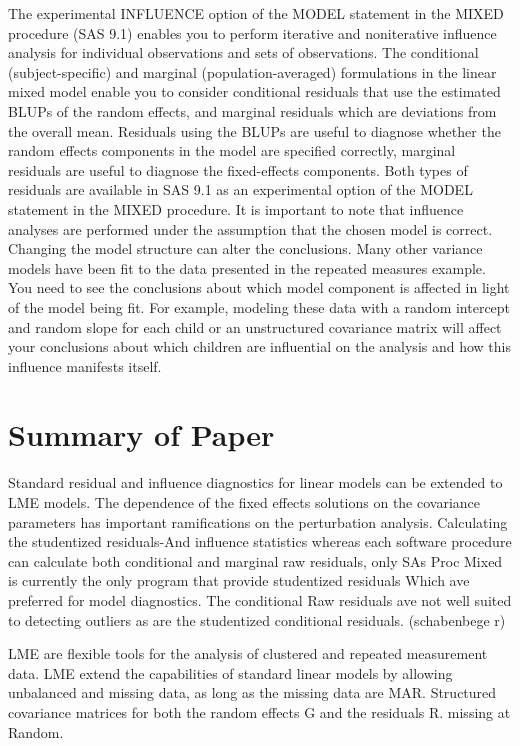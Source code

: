 \documentclass[Chap5amain.tex]{subfiles}
\begin{document}
The experimental INFLUENCE
option of the MODEL statement in the MIXED procedure (SAS 9.1) enables you to perform iterative and
noniterative influence analysis for individual observations and sets of observations.
The conditional (subject-specific) and marginal (population-averaged) formulations in the linear mixed model
enable you to consider conditional residuals that use the estimated BLUPs of the random effects, and
marginal residuals which are deviations from the overall mean. Residuals using the BLUPs are useful to
diagnose whether the random effects components in the model are specified correctly, marginal residuals
are useful to diagnose the fixed-effects components. Both types of residuals are available in SAS 9.1 as an
experimental option of the MODEL statement in the MIXED procedure.
It is important to note that influence analyses are performed under the assumption that the chosen model
is correct. Changing the model structure can alter the conclusions. Many other variance models have been
fit to the data presented in the repeated measures example. You need to see the conclusions about which
model component is affected in light of the model being fit. For example, modeling these data with a random
intercept and random slope for each child or an unstructured covariance matrix will affect your conclusions
about which children are influential on the analysis and how this influence manifests itself.
\section{Summary of Paper}
Standard residual and influence diagnostics for linear models can be extended to LME models.
The dependence of the fixed effects solutions on the covariance parameters has important ramifications on the perturbation analysis.	
Calculating the studentized residuals-And influence statistics whereas each software procedure can calculate both conditional and marginal raw residuals, only SAs Proc Mixed is currently the only program that provide studentized residuals Which ave preferred for model diagnostics. The conditional Raw residuals ave not well suited to detecting outliers as are the studentized conditional residuals. (schabenbege r)


LME are flexible tools for the analysis of clustered and repeated measurement data. LME extend the capabilities of standard linear models by allowing unbalanced and missing data, as long as the missing data are MAR. Structured covariance matrices for both the random effects G and the residuals R. missing at Random.
\end{document}
